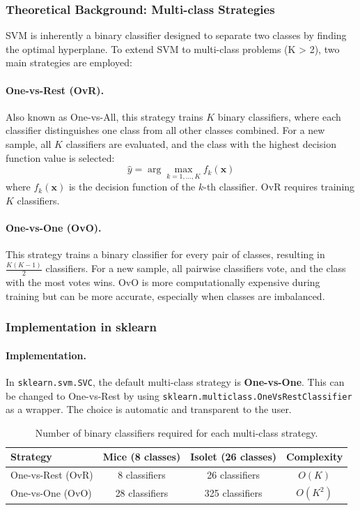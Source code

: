 \documentclass[12pt]{article}
\begin{document}
\subsubsection{Theoretical Background: Multi-class Strategies}
SVM is inherently a binary classifier designed to separate two classes by finding the optimal hyperplane. To extend SVM to multi-class problems (K > 2), two main strategies are employed:

\paragraph{One-vs-Rest (OvR).} Also known as One-vs-All, this strategy trains $K$ binary classifiers, where each classifier distinguishes one class from all other classes combined. For a new sample, all $K$ classifiers are evaluated, and the class with the highest decision function value is selected:
\begin{equation}
    \hat{y} = \arg\max_{k=1,\ldots,K} f_k(\mathbf{x})
\end{equation}
where $f_k(\mathbf{x})$ is the decision function of the $k$-th classifier. OvR requires training $K$ classifiers.

\paragraph{One-vs-One (OvO).} This strategy trains a binary classifier for every pair of classes, resulting in $\frac{K(K-1)}{2}$ classifiers. For a new sample, all pairwise classifiers vote, and the class with the most votes wins. OvO is more computationally expensive during training but can be more accurate, especially when classes are imbalanced.

\subsubsection{Implementation in sklearn}
\paragraph{Implementation.} In \texttt{sklearn.svm.SVC}, the default multi-class strategy is \textbf{One-vs-One}. This can be changed to One-vs-Rest by using \texttt{sklearn.multiclass.OneVsRestClassifier} as a wrapper. The choice is automatic and transparent to the user.

\begin{table}[H]
\centering
\begin{tabular}{lccc}
\toprule
\textbf{Strategy} & \textbf{Mice (8 classes)} & \textbf{Isolet (26 classes)} & \textbf{Complexity} \\
\midrule
One-vs-Rest (OvR) & 8 classifiers & 26 classifiers & $O(K)$ \\
One-vs-One (OvO) & 28 classifiers & 325 classifiers & $O(K^2)$ \\
\bottomrule
\end{tabular}
\caption{Number of binary classifiers required for each multi-class strategy.}
\label{tab:multiclass_strategies}
\end{table}
\end{document}

